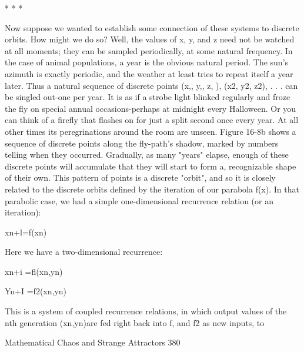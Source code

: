                                          *   *   *

        Now suppose we wanted to establish some connection of these systems to
discrete orbits. How might we do so? Well, the values of x, y, and z need not be
watched at all moments; they can be sampled periodically, at some natural frequency.
In the case of animal populations, a year is the obvious natural period. The sun's
azimuth is exactly periodic, and the weather at least tries to repeat itself a year later.
Thus a natural sequence of discrete points (x,, y,, z, ), (x2, y2, z2), . . . can be singled
out-one per year. It is as if a strobe light blinked regularly and froze the fly on special
annual occasions-perhaps at midnight every Halloween. Or you can think of a firefly
that flashes on for just a split second once every year. At all other times its
peregrinations around the room are unseen. Figure 16-8b shows a sequence of discrete
points along the fly-path's shadow, marked by numbers telling when they occurred.
Gradually, as many "years" elapse, enough of these discrete points will accumulate
that they will start to form a, recognizable shape of their own. This pattern of points is
a discrete "orbit", and so it is closely related to the discrete orbits defined by the
iteration of our parabola f(x). In that parabolic case, we had a simple one-dimensional
recurrence relation (or an iteration):

       xn+l=f(xn)

Here we have a two-dimensional recurrence:

       xn+i =fl(xn,yn)

       Yn+I =f2(xn,yn)

This is a system of coupled recurrence relations, in which output values of the nth
generation (xn,yn)are fed right back into f, and f2 as new inputs, to




Mathematical Chaos and Strange Attractors                                              380

